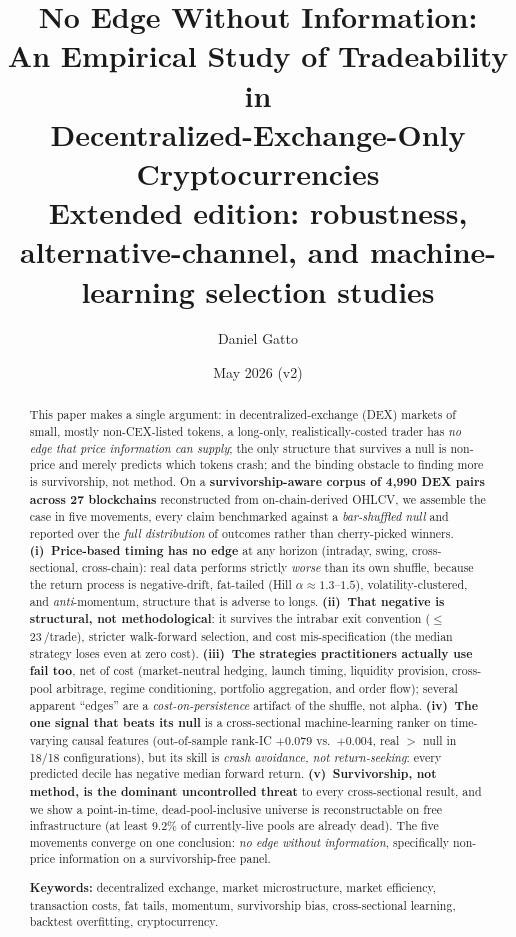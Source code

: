 \documentclass[12pt]{article}
\title{\bf No Edge Without Information:\\[2pt] An Empirical Study of Tradeability in\\ Decentralized-Exchange-Only Cryptocurrencies\\[6pt]
\large\normalfont Extended edition: robustness, alternative-channel, and machine-learning selection studies}
\author[1]{Daniel Gatto}
\affil[1]{Independent Researcher, \texttt{daru.finance}}
\date{May 2026 (v2)}
\newcommand{\bp}{\,\text{bp}}
\begin{document}
\maketitle
\begin{abstract}
\noindent This paper makes a single argument: in decentralized-exchange (DEX) markets of small, mostly non-CEX-listed tokens, a long-only, realistically-costed trader has \emph{no edge that price information can supply}; the only structure that survives a null is non-price and merely predicts which tokens crash; and the binding obstacle to finding more is survivorship, not method. On a \textbf{survivorship-aware corpus of 4{,}990 DEX pairs across 27 blockchains} reconstructed from on-chain-derived OHLCV, we assemble the case in five movements, every claim benchmarked against a \emph{bar-shuffled null} and reported over the \emph{full distribution} of outcomes rather than cherry-picked winners. \textbf{(i)~Price-based timing has no edge} at any horizon (intraday, swing, cross-sectional, cross-chain): real data performs strictly \emph{worse} than its own shuffle, because the return process is negative-drift, fat-tailed (Hill $\alpha\!\approx\!1.3$--$1.5$), volatility-clustered, and \emph{anti}-momentum, structure that is adverse to longs. \textbf{(ii)~That negative is structural, not methodological}: it survives the intrabar exit convention ($\leq$23\bp/trade), stricter walk-forward selection, and cost mis-specification (the median strategy loses even at zero cost). \textbf{(iii)~The strategies practitioners actually use fail too}, net of cost (market-neutral hedging, launch timing, liquidity provision, cross-pool arbitrage, regime conditioning, portfolio aggregation, and order flow); several apparent ``edges'' are a \emph{cost-on-persistence} artifact of the shuffle, not alpha. \textbf{(iv)~The one signal that beats its null} is a cross-sectional machine-learning ranker on time-varying causal features (out-of-sample rank-IC $+0.079$ vs.\ $+0.004$, real $>$ null in 18/18 configurations), but its skill is \emph{crash avoidance, not return-seeking}: every predicted decile has negative median forward return. \textbf{(v)~Survivorship, not method, is the dominant uncontrolled threat} to every cross-sectional result, and we show a point-in-time, dead-pool-inclusive universe is reconstructable on free infrastructure (at least 9.2\% of currently-live pools are already dead). The five movements converge on one conclusion: \emph{no edge without information}, specifically non-price information on a survivorship-free panel.

\smallskip\noindent\textbf{Keywords:} decentralized exchange, market microstructure, market efficiency, transaction costs, fat tails, momentum, survivorship bias, cross-sectional learning, backtest overfitting, cryptocurrency.
\end{abstract}
\end{document}
